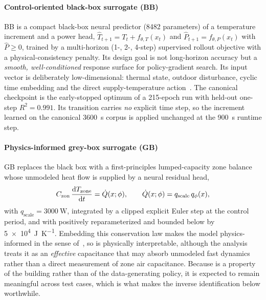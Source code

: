 \paragraph{Control-oriented black-box surrogate (BB)}
BB is a compact black-box neural predictor (8482 parameters) of a temperature increment and a power
head, $\widehat{T}_{t+1}=T_t+f_{\theta,T}(x_t)$ and $\widehat{P}_{t+1}=f_{\theta,P}(x_t)$ with
$\widehat{P}\ge 0$, trained by a multi-horizon (1-, 2-, 4-step) supervised rollout objective with a
physical-consistency penalty. Its design goal is not long-horizon accuracy but a \emph{smooth,
well-conditioned} response surface for policy-gradient search. Its input vector is deliberately
low-dimensional: thermal state, outdoor disturbance, cyclic time embedding and the direct
supply-temperature action~\cite{Sun2024DirectTSup}. The canonical checkpoint is the early-stopped
optimum of a 215-epoch run with held-out one-step $R^2=0.991$. Its transition carries \emph{no}
explicit time step, so the increment learned on the canonical \SI{3600}{\second} corpus is applied
unchanged at the \SI{900}{\second} runtime step.

\paragraph{Physics-informed grey-box surrogate (GB)}
GB replaces the black box with a first-principles lumped-capacity zone balance whose unmodeled heat
flow is supplied by a neural residual head,
\begin{equation}
C_{\mathrm{zon}}\,\frac{\mathrm{d}T_{\mathrm{zone}}}{\mathrm{d}t}=\dot{Q}(x;\phi),
\qquad \dot{Q}(x;\phi)=q_{\mathrm{scale}}\,q_\phi(x),
\label{eq:rc}
\end{equation}
with $q_{\mathrm{scale}}=\SI{3000}{\watt}$, integrated by a clipped explicit Euler step at the
control period, and with \Czon{} positively reparameterized and bounded below by
\SI{5e4}{\joule\per\kelvin}. Embedding this conservation law makes the model physics-informed in the
sense of~\cite{Raissi2019PINN,Karpatne2017TheoryGuided,Willard2022PIML,Hedayat2025PINN}, so \Czon{}
is physically interpretable, although the analysis treats it as an \emph{effective} capacitance that
may absorb unmodeled fast dynamics rather than a direct measurement of zone air capacitance. Because
\Czon{} is a property of the building rather than of the data-generating policy, it is expected to
remain meaningful across test cases, which is what makes the inverse identification below
worthwhile.

